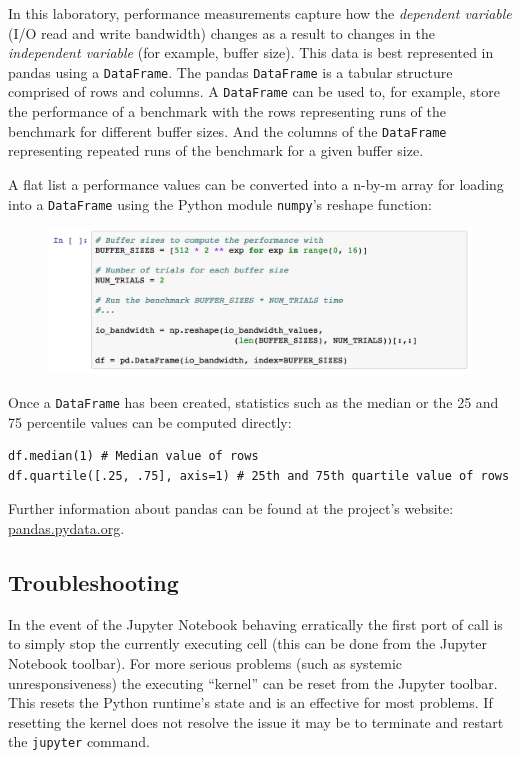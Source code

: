 \documentclass[a4paper,10pt]{article}
\newcommand{\code}[1]{\texttt{\small #1}}
\begin{document}
{In this laboratory, performance measurements capture how the \textit{dependent
variable} (I/O read and write bandwidth) changes as a result to changes in the
\textit{independent variable} (for example, buffer size).  This data is best
represented in pandas using a \code{DataFrame}. The pandas \code{DataFrame} is
a tabular structure comprised of rows and columns. A \code{DataFrame} can be
used to, for example, store the performance of a benchmark with the rows
representing runs of the benchmark for different buffer sizes. And the columns
of the \code{DataFrame} representing repeated runs of the benchmark for a given
buffer size. 

A flat list a performance values can be converted into a n-by-m array for
loading into a \code{DataFrame} using the Python module \code{numpy}'s
reshape function:

\begin{figure}[H]
\includegraphics[width=\linewidth]{jupyter_pandas.png}
\end{figure}

Once a \code{DataFrame} has been created, statistics such as the median or
the 25 and 75 percentile values can be computed directly:

\begin{small}
\begin{verbatim}
df.median(1) # Median value of rows
df.quartile([.25, .75], axis=1) # 25th and 75th quartile value of rows
\end{verbatim}
\end{small}

Further information about pandas can be found at the project's website:
\url{pandas.pydata.org}.

\subsection*{Troubleshooting}

In the event of the Jupyter Notebook behaving erratically the first port of
call is to simply stop the currently executing cell (this can be done from the
Jupyter Notebook toolbar). For more serious problems (such as systemic
unresponsiveness) the executing ``kernel'' can be reset from the Jupyter
toolbar. This resets the Python runtime's state and is an effective for most
problems. If resetting the kernel does not resolve the issue it may be to
terminate and restart the \code{jupyter} command.

}
\end{document}
